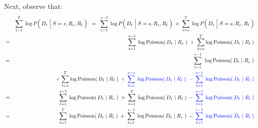 \noindent
Next, observe that:
\begin{eqnarray*}
&&
	\overset{T}{\underset{t=1}{\sum}}\;
	\log P\!\left(\,D_{t} \,\left\vert\; S\overset{{\color{white}1}}{=}s,R_{e},R_{l}\right.\,\right)
\;\; = \;\;
	\overset{s-1}{\underset{t=1}{\sum}}\;
	\log P\!\left(\,D_{t} \,\left\vert\; S\overset{{\color{white}1}}{=}s,R_{e},R_{l}\right.\,\right)
	\; + \;
	\overset{T}{\underset{t=s}{\sum}}\;
	\log P\!\left(\,D_{t} \,\left\vert\; S\overset{{\color{white}1}}{=}s,R_{e},R_{l}\right.\,\right)
\\
&=&
	\overset{s-1}{\underset{t=1}{\sum}}\;
	\log\textnormal{Poisson}\!\left(\,D_{t} \,\left\vert\; R_{e}\right.\,\right)
	\; + \;
	\overset{T}{\underset{t=s}{\sum}}
	\log\textnormal{Poisson}\!\left(\,D_{t} \,\left\vert\; R_{l}\right.\,\right)
\\
&=&
	{\color{white}+}\;\;\,
	\overset{s-1}{\underset{t=1}{\sum}}\;\,
	\log\textnormal{Poisson}\!\left(\,D_{t} \,\left\vert\; R_{e}\right.\,\right)
\\
&&
	+\;
	\overset{T}{\underset{t=s}{\sum}}
	\log\textnormal{Poisson}\!\left(\,D_{t} \,\left\vert\; R_{l}\right.\,\right)
	{\color{blue}
		\;+\;\,
		\overset{s-1}{\underset{t=1}{\sum}}\;
		\log\textnormal{Poisson}\!\left(\,D_{t} \,\left\vert\; R_{l}\right.\,\right)
		\;-\;
		\overset{s-1}{\underset{t=1}{\sum}}\;
		\log\textnormal{Poisson}\!\left(\,D_{t} \,\left\vert\; R_{l}\right.\,\right)
		}
\\
&=&
	\overset{s-1}{\underset{t=1}{\sum}}\;
	\log\textnormal{Poisson}\!\left(\,D_{t} \,\left\vert\; R_{e}\right.\,\right)
	\;+\;
	\overset{T}{\underset{t=1}{\sum}}\;
	\log\textnormal{Poisson}\!\left(\,D_{t} \,\left\vert\; R_{l}\right.\,\right)
	{\color{blue}
		\;-\;\,
		\overset{s-1}{\underset{t=1}{\sum}}\;
		\log\textnormal{Poisson}\!\left(\,D_{t} \,\left\vert\; R_{l}\right.\,\right)
		}
\\
&=&
	\overset{T}{\underset{t=1}{\sum}}\;
	\log\textnormal{Poisson}\!\left(\,D_{t} \,\left\vert\; R_{l}\right.\,\right)
	\;+\;
	\overset{s-1}{\underset{t=1}{\sum}}\;
	\log\textnormal{Poisson}\!\left(\,D_{t} \,\left\vert\; R_{e}\right.\,\right)
	{\color{blue}
		\;-\;\,
		\overset{s-1}{\underset{t=1}{\sum}}\;
		\log\textnormal{Poisson}\!\left(\,D_{t} \,\left\vert\; R_{l}\right.\,\right)
		}
\end{eqnarray*}



